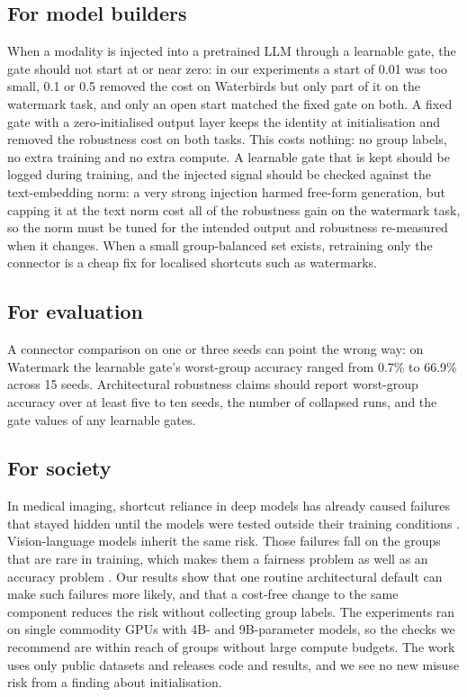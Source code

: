 \subsection{For model builders}

When a modality is injected into a pretrained LLM through a learnable gate, the gate should not start at or near zero:
in our experiments a start of 0.01 was too small, 0.1 or 0.5 removed the cost on Waterbirds but only part of it on
the watermark task, and only an open start matched the fixed gate on both. A fixed gate with a zero-initialised
output layer keeps the identity at initialisation and removed the robustness cost on both tasks. This costs nothing: no group labels, no extra
training and no extra compute. A learnable gate that is kept should be logged during training, and the injected
signal should be checked against the text-embedding norm: a very strong injection harmed free-form generation, but
capping it at the text norm cost all of the robustness gain on the watermark task, so the norm must be tuned for
the intended output and robustness re-measured when it changes. When a small group-balanced set exists, retraining only the connector is a cheap fix for localised
shortcuts such as watermarks.

\subsection{For evaluation}

A connector comparison on one or three seeds can point the wrong way: on Watermark the learnable gate's worst-group
accuracy ranged from 0.7\% to 66.9\% across 15 seeds. Architectural robustness claims should report worst-group accuracy over at
least five to ten seeds, the number of collapsed runs, and the gate values of any learnable gates.

\subsection{For society}

In medical imaging, shortcut reliance in deep models has already caused failures that stayed hidden until the models
were tested outside their training conditions \citep{degrave2021covid,brown2023shortcut}. Vision-language models inherit
the same risk. Those failures fall on the groups that are rare in training, which makes them a fairness problem
as well as an accuracy problem \citep{ongly2024shortcut}. Our results show that one routine architectural default can make
such failures more likely, and that a cost-free change to the same component reduces the risk without collecting
group labels. The experiments ran on single commodity GPUs with 4B- and 9B-parameter models, so the checks we recommend are
within reach of groups without large compute budgets. The work uses only public datasets and releases code and
results, and we see no new misuse risk from a finding about initialisation.

